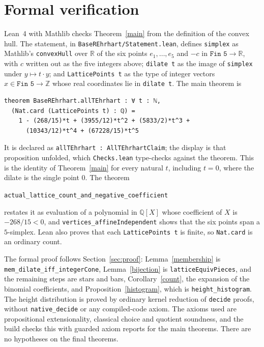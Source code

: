 \documentclass[11pt]{article}
\theoremstyle{remark}
\newcommand{\ZZ}{\mathbb{Z}}
\newcommand{\RR}{\mathbb{R}}
\begin{document}
\section{Formal verification}\label{sec:lean}
Lean~4 with Mathlib checks Theorem~\ref{main} from the definition of the convex hull. The statement, in \texttt{BaseREhrhart/Statement.lean}, defines \texttt{simplex} as Mathlib's \texttt{convexHull} over $\RR$ of the six points $e_1,\dots,e_5$ and $-c$ in $\texttt{Fin 5}\to\RR$, with $c$ written out as the five integers above; \texttt{dilate t} as the image of \texttt{simplex} under $y\mapsto t\cdot y$; and \texttt{LatticePoints t} as the type of integer vectors $x\in\texttt{Fin 5}\to\ZZ$ whose real coordinates lie in \texttt{dilate t}. The main theorem is
\begin{verbatim}
theorem BaseREhrhart.allTEhrhart : ∀ t : ℕ,
  (Nat.card (LatticePoints t) : ℚ) =
    1 - (268/15)*t + (3955/12)*t^2 + (5833/2)*t^3 +
      (10343/12)*t^4 + (67228/15)*t^5
\end{verbatim}
It is declared as \texttt{allTEhrhart : AllTEhrhartClaim}; the display is that proposition unfolded, which \texttt{Checks.lean} type-checks against the theorem. This is the identity of Theorem~\ref{main} for every natural $t$, including $t=0$, where the dilate is the single point $0$. The theorem
\begin{center}\texttt{actual\_lattice\_count\_and\_negative\_coefficient}\end{center}
restates it as evaluation of a polynomial in $\mathbb{Q}[X]$ whose coefficient of $X$ is $-268/15<0$, and \texttt{vertices\_affineIndependent} shows that the six points span a $5$-simplex. Lean also proves that each \texttt{LatticePoints t} is finite, so \texttt{Nat.card} is an ordinary count.

The formal proof follows Section~\ref{sec:proof}: Lemma~\ref{membership} is \texttt{mem\_dilate\_iff\_integerCone}, Lemma~\ref{bijection} is \texttt{latticeEquivPieces}, and the remaining steps are stars and bars, Corollary~\ref{count}, the expansion of the binomial coefficients, and Proposition~\ref{histogram}, which is \texttt{height\_histogram}. The height distribution is proved by ordinary kernel reduction of \texttt{decide} proofs, without \texttt{native\_decide} or any compiled-code axiom. The axioms used are propositional extensionality, classical choice and quotient soundness, and the build checks this with guarded axiom reports for the main theorems. There are no hypotheses on the final theorems.
\end{document}
